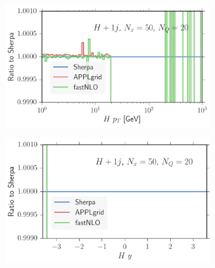 \begin{figure}
\centering
\begin{subfigure}[]{0.49\textwidth}
	\includegraphics[width=\textwidth]{images/hjrs_hpt.pdf}
\end{subfigure}
\hfill
\begin{subfigure}[]{0.49\textwidth}
	\includegraphics[width=\textwidth]{images/hjrs_hy.pdf}
\end{subfigure}


\end{figure}
